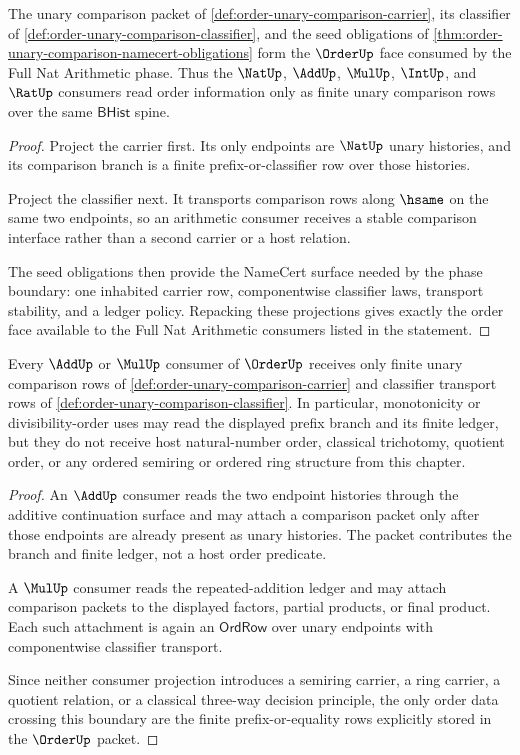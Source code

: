\begin{theorem}
\label{thm:order-full-nat-arithmetic-handoff}
The unary comparison packet of \autoref{def:order-unary-comparison-carrier}, its classifier of \autoref{def:order-unary-comparison-classifier}, and the seed obligations of \autoref{thm:order-unary-comparison-namecert-obligations} form the $\OrderUp$ face consumed by the Full Nat Arithmetic phase. Thus the $\NatUp$, $\AddUp$, $\MulUp$, $\IntUp$, and $\RatUp$ consumers read order information only as finite unary comparison rows over the same $\mathsf{BHist}$ spine.
\end{theorem}
\begin{proof}
Project the carrier first. Its only endpoints are $\NatUp$ unary histories, and its comparison branch is a finite prefix-or-classifier row over those histories.

Project the classifier next. It transports comparison rows along $\hsame$ on the same two endpoints, so an arithmetic consumer receives a stable comparison interface rather than a second carrier or a host relation.

The seed obligations then provide the NameCert surface needed by the phase boundary: one inhabited carrier row, componentwise classifier laws, transport stability, and a ledger policy. Repacking these projections gives exactly the order face available to the Full Nat Arithmetic consumers listed in the statement.
\end{proof}

\begin{theorem}
\label{thm:order-add-mul-consumer-boundary}
Every $\AddUp$ or $\MulUp$ consumer of $\OrderUp$ receives only finite unary comparison rows of \autoref{def:order-unary-comparison-carrier} and classifier transport rows of \autoref{def:order-unary-comparison-classifier}. In particular, monotonicity or divisibility-order uses may read the displayed prefix branch and its finite ledger, but they do not receive host natural-number order, classical trichotomy, quotient order, or any ordered semiring or ordered ring structure from this chapter.
\end{theorem}
\begin{proof}
An $\AddUp$ consumer reads the two endpoint histories through the additive continuation surface and may attach a comparison packet only after those endpoints are already present as unary histories. The packet contributes the branch and finite ledger, not a host order predicate.

A $\MulUp$ consumer reads the repeated-addition ledger and may attach comparison packets to the displayed factors, partial products, or final product. Each such attachment is again an $\mathsf{OrdRow}$ over unary endpoints with componentwise classifier transport.

Since neither consumer projection introduces a semiring carrier, a ring carrier, a quotient relation, or a classical three-way decision principle, the only order data crossing this boundary are the finite prefix-or-equality rows explicitly stored in the $\OrderUp$ packet.
\end{proof}

